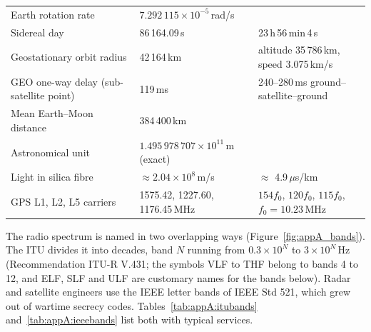 \begin{table}[htbp]
\begin{tabular}{@{}lll@{}}
Earth rotation rate & $7.292\,115\times10^{-5}$\,rad/s & \\
Sidereal day & 86\,164.09\,s & 23\,h\,56\,min\,4\,s\\
Geostationary orbit radius & 42\,164\,km & altitude 35\,786\,km, speed 3.075\,km/s\\
GEO one-way delay (sub-satellite point) & 119\,ms & 240--280\,ms ground--satellite--ground\\
Mean Earth--Moon distance & 384\,400\,km & \\
Astronomical unit & $1.495\,978\,707\times10^{11}$\,m (exact) & \\
\midrule
Light in silica fibre & $\approx2.04\times10^8$\,m/s & $\approx$ 4.9\,$\mu$s/km\\
GPS L1, L2, L5 carriers & 1575.42, 1227.60, 1176.45\,MHz & $154f_0$, $120f_0$, $115f_0$, $f_0=10.23$\,MHz\\
\bottomrule
\end{tabular}
\end{table}

The radio spectrum is named in two overlapping ways (Figure~\ref{fig:appA_bands}). The ITU
divides it into decades, band $N$ running from $0.3\times10^N$ to $3\times10^N$\,Hz
(Recommendation ITU-R V.431; the symbols VLF to THF belong to bands 4 to 12, and ELF, SLF and ULF
are customary names for the bands below). Radar and satellite engineers use the IEEE letter bands
of IEEE Std 521, which grew out of wartime secrecy codes. Tables~\ref{tab:appA:itubands}
and~\ref{tab:appA:ieeebands} list both with typical services.


